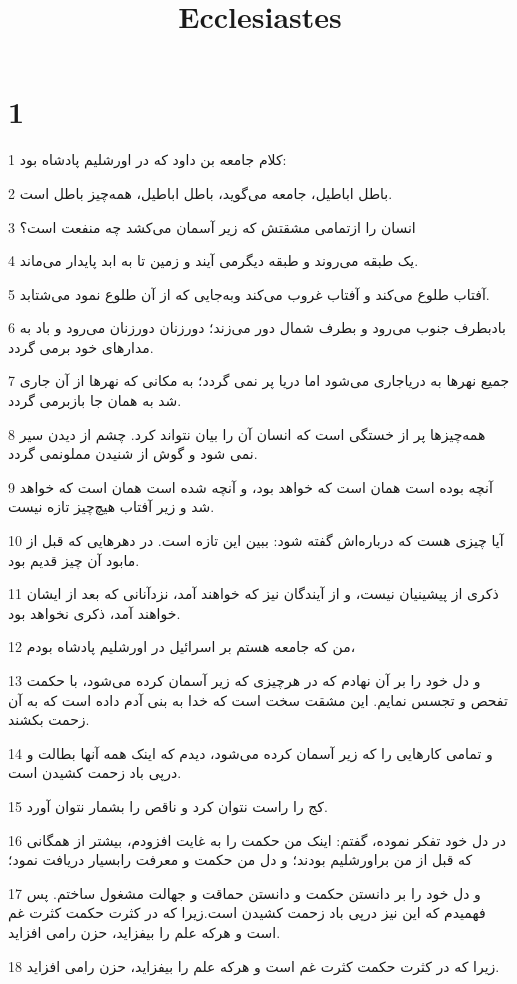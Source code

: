 

\title{Ecclesiastes}

 
\chapter{1}

\par 1 کلام جامعه بن داود که در اورشلیم پادشاه بود:
\par 2 باطل اباطیل، جامعه می‌گوید، باطل اباطیل، همه‌چیز باطل است.
\par 3 انسان را ازتمامی مشقتش که زیر آسمان می‌کشد چه منفعت است؟
\par 4 یک طبقه می‌روند و طبقه دیگرمی آیند و زمین تا به ابد پایدار می‌ماند.
\par 5 آفتاب طلوع می‌کند و آفتاب غروب می‌کند وبه‌جایی که از آن طلوع نمود می‌شتابد.
\par 6 بادبطرف جنوب می‌رود و بطرف شمال دور می‌زند؛ دورزنان دورزنان می‌رود و باد به مدارهای خود برمی گردد.
\par 7 جمیع نهرها به دریاجاری می‌شود اما دریا پر نمی گردد؛ به مکانی که نهرها از آن جاری شد به همان جا بازبرمی گردد.
\par 8 همه‌چیزها پر از خستگی است که انسان آن را بیان نتواند کرد. چشم از دیدن سیر نمی شود و گوش از شنیدن مملونمی گردد.
\par 9 آنچه بوده است همان است که خواهد بود، و آنچه شده است همان است که خواهد شد و زیر آفتاب هیچ‌چیز تازه نیست.
\par 10 آیا چیزی هست که درباره‌اش گفته شود: ببین این تازه است. در دهرهایی که قبل از مابود آن چیز قدیم بود.
\par 11 ذکری از پیشینیان نیست، و از آیندگان نیز که خواهند آمد، نزدآنانی که بعد از ایشان خواهند آمد، ذکری نخواهد بود.
\par 12 من که جامعه هستم بر اسرائیل در اورشلیم پادشاه بودم،
\par 13 و دل خود را بر آن نهادم که در هرچیزی که زیر آسمان کرده می‌شود، با حکمت تفحص و تجسس نمایم. این مشقت سخت است که خدا به بنی آدم داده است که به آن زحمت بکشند.
\par 14 و تمامی کارهایی را که زیر آسمان کرده می‌شود، دیدم که اینک همه آنها بطالت و درپی باد زحمت کشیدن است.
\par 15 کج را راست نتوان کرد و ناقص را بشمار نتوان آورد.
\par 16 در دل خود تفکر نموده، گفتم: اینک من حکمت را به غایت افزودم، بیشتر از همگانی که قبل از من براورشلیم بودند؛ و دل من حکمت و معرفت رابسیار دریافت نمود؛
\par 17 و دل خود را بر دانستن حکمت و دانستن حماقت و جهالت مشغول ساختم. پس فهمیدم که این نیز در‌پی باد زحمت کشیدن است.زیرا که در کثرت حکمت کثرت غم است و هر‌که علم را بیفزاید، حزن رامی افزاید.
\par 18 زیرا که در کثرت حکمت کثرت غم است و هر‌که علم را بیفزاید، حزن رامی افزاید.
 

